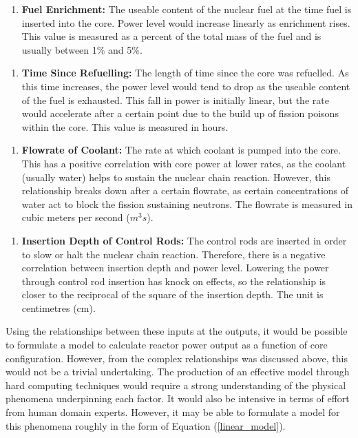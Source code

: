 \begin{enumerate} [label=$x_1$]
	
	\item \textbf{Fuel Enrichment:} The useable content of the nuclear fuel at the time fuel is inserted into the core. Power level would increase linearly as enrichment rises. This value is measured as a percent of the total mass of the fuel and is usually between 1\% and 5\%.
	 

\end{enumerate}

\begin{enumerate} [label=$x_2$]
	
		\item \textbf{Time Since Refuelling:} The length of time since the core was refuelled. As this time increases, the power level would tend to drop as the useable content of the fuel is exhausted. This fall in power is initially linear, but the rate would accelerate after a certain point due to the build up of fission poisons within the core. This value is measured in hours.

\end{enumerate}

\begin{enumerate} [label=$x_3$]
		
	\item  \textbf{Flowrate of Coolant:} The rate at which coolant is pumped into the core. This has a positive correlation with core power at lower rates, as the coolant (usually water) helps to sustain the nuclear chain reaction. However, this relationship breaks down after a certain flowrate, as certain concentrations of water act to block the fission sustaining neutrons. The flowrate is measured in cubic meters per second ($m^3s$).
	
\end{enumerate}

\begin{enumerate} [label=$x_4$]
	
	\item \textbf{Insertion Depth of Control Rods:} The control rods are inserted in order to slow or halt the nuclear chain reaction. Therefore, there is a negative correlation between insertion depth and power level. Lowering the power through control rod insertion has knock on effects, so the relationship is closer to the reciprocal of the square of the insertion depth. The unit is centimetres (cm). 
	
\end{enumerate}
\noindent
Using the relationships between these inputs at the outputs, it would be possible to formulate a model to calculate reactor power output as a function of core configuration. However, from the complex relationships was discussed above, this would not be a trivial undertaking. The production of an effective model through hard computing techniques would require a strong understanding of the physical phenomena underpinning each factor. It would also be intensive in terms of effort from human domain experts. However, it may be able to formulate a model for this phenomena roughly in the form of Equation (\ref{linear_model}). \\

